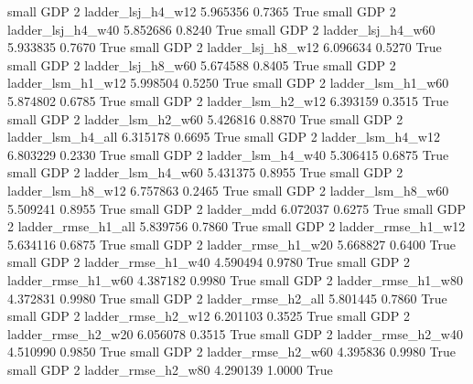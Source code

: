      small      GDP                 2        ladder_lsj_h4_w12   5.965356      0.7365    True
     small      GDP                 2        ladder_lsj_h4_w40   5.852686      0.8240    True
     small      GDP                 2        ladder_lsj_h4_w60   5.933835      0.7670    True
     small      GDP                 2        ladder_lsj_h8_w12   6.096634      0.5270    True
     small      GDP                 2        ladder_lsj_h8_w60   5.674588      0.8405    True
     small      GDP                 2        ladder_lsm_h1_w12   5.998504      0.5250    True
     small      GDP                 2        ladder_lsm_h1_w60   5.874802      0.6785    True
     small      GDP                 2        ladder_lsm_h2_w12   6.393159      0.3515    True
     small      GDP                 2        ladder_lsm_h2_w60   5.426816      0.8870    True
     small      GDP                 2        ladder_lsm_h4_all   6.315178      0.6695    True
     small      GDP                 2        ladder_lsm_h4_w12   6.803229      0.2330    True
     small      GDP                 2        ladder_lsm_h4_w40   5.306415      0.6875    True
     small      GDP                 2        ladder_lsm_h4_w60   5.431375      0.8955    True
     small      GDP                 2        ladder_lsm_h8_w12   6.757863      0.2465    True
     small      GDP                 2        ladder_lsm_h8_w60   5.509241      0.8955    True
     small      GDP                 2               ladder_mdd   6.072037      0.6275    True
     small      GDP                 2       ladder_rmse_h1_all   5.839756      0.7860    True
     small      GDP                 2       ladder_rmse_h1_w12   5.634116      0.6875    True
     small      GDP                 2       ladder_rmse_h1_w20   5.668827      0.6400    True
     small      GDP                 2       ladder_rmse_h1_w40   4.590494      0.9780    True
     small      GDP                 2       ladder_rmse_h1_w60   4.387182      0.9980    True
     small      GDP                 2       ladder_rmse_h1_w80   4.372831      0.9980    True
     small      GDP                 2       ladder_rmse_h2_all   5.801445      0.7860    True
     small      GDP                 2       ladder_rmse_h2_w12   6.201103      0.3525    True
     small      GDP                 2       ladder_rmse_h2_w20   6.056078      0.3515    True
     small      GDP                 2       ladder_rmse_h2_w40   4.510990      0.9850    True
     small      GDP                 2       ladder_rmse_h2_w60   4.395836      0.9980    True
     small      GDP                 2       ladder_rmse_h2_w80   4.290139      1.0000    True
